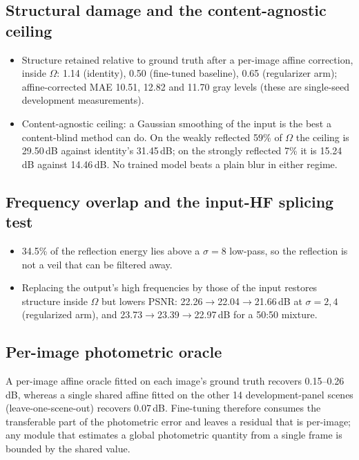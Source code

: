\documentclass[10pt]{article}
\newcommand{\Om}{\Omega}
\begin{document}
\subsection{Structural damage and the content-agnostic ceiling}
\begin{itemize}
\item Structure retained relative to ground truth after a per-image affine
  correction, inside $\Om$: 1.14 (identity), 0.50 (fine-tuned baseline), 0.65
  (regularizer arm); affine-corrected MAE 10.51, 12.82 and 11.70 gray levels (these
  are single-seed development measurements).
\item Content-agnostic ceiling: a Gaussian smoothing of the input is the best a
  content-blind method can do. On the weakly reflected 59\% of $\Om$ the ceiling is
  29.50\,dB against identity's 31.45\,dB; on the strongly reflected 7\% it is
  15.24\,dB against 14.46\,dB. No trained model beats a plain blur in either regime.
\end{itemize}

\subsection{Frequency overlap and the input-HF splicing test}
\begin{itemize}
\item 34.5\% of the reflection energy lies above a $\sigma{=}8$ low-pass, so the
  reflection is not a veil that can be filtered away.
\item Replacing the output's high frequencies by those of the input restores
  structure inside $\Om$ but lowers PSNR: 22.26$\rightarrow$22.04$\rightarrow$21.66\,dB
  at $\sigma{=}2,4$ (regularized arm), and 23.73$\rightarrow$23.39$\rightarrow$22.97\,dB
  for a 50:50 mixture.
\end{itemize}

\subsection{Per-image photometric oracle}
A per-image affine oracle fitted on each image's ground truth recovers
0.15--0.26\,dB, whereas a single shared affine fitted on the other 14
development-panel scenes (leave-one-scene-out) recovers 0.07\,dB. Fine-tuning
therefore consumes the transferable part of the photometric error and leaves a
residual that is per-image; any module that estimates a global photometric quantity
from a single frame is bounded by the shared value.
\end{document}
